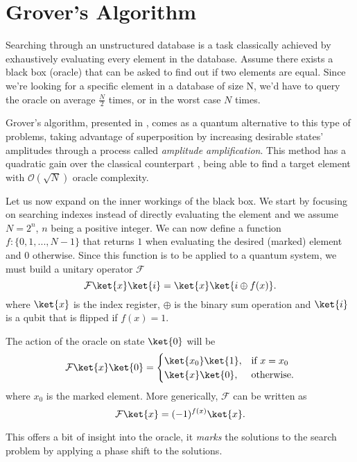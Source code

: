 	\section{Grover's Algorithm}\label{chapGrover}
	Searching through an unstructured database is a task classically achieved by exhaustively evaluating every element in the database. Assume there exists a black box (oracle) that can be asked to find out if two elements are equal. Since we're looking for a specific element in a database of size N, we'd have to query the oracle on average $\frac{N}{2}$ times, or in the worst case $N$ times.\par
	Grover's algorithm, presented in \cite{grover1996}, comes as a quantum alternative to this type of problems, taking advantage of superposition by increasing desirable states' amplitudes through a process called \textit{amplitude amplification}. This method has a quadratic gain over the classical counterpart \cite{boyer1996}, being able to find a target element with $\mathcal{O}(\sqrt{N})$ oracle complexity.\par
	Let us now expand on the inner workings of the black box. We start by focusing on searching indexes     instead of directly evaluating the element and we assume $N=2^{n}$, $n$ being a positive integer. We can now define a function $f : \{0,1,...,N-1\}$ that returns $1$ when evaluating the desired (marked) element and $0$ otherwise. Since this function is to be applied to a quantum system, we must build a unitary operator $\mathcal{F}$
	\begin{equation}
		\mathcal{F}\ket{x}\ket{i} = \ket{x}\ket{i\oplus f(x)} .
	\end{equation}
	where $\ket{x}$ is the index register, $\oplus$ is the binary sum operation and $\ket{i}$ is a qubit that is flipped if $f(x)=1$.\par 
	The action of the oracle on state $\ket{0}$ will be
	\begin{equation}
		\mathcal{F}\ket{x}\ket{0} = \begin{cases} \ket{x_0}\ket{1}, & \mbox{if } x = x_0 \\ \ket{x}\ket{0}, & \mbox{otherwise.} \end{cases}
	\end{equation}
	where $x_0$ is the marked element. More generically, $\mathcal{F}$ can be written as
	\begin{equation}
		\mathcal{F}\ket{x} = (-1)^{f(x)}\ket{x} .
	\end{equation}\par
	This offers a bit of insight into the oracle, it \textit{marks} the solutions to the search problem by applying a phase shift to the solutions. 
